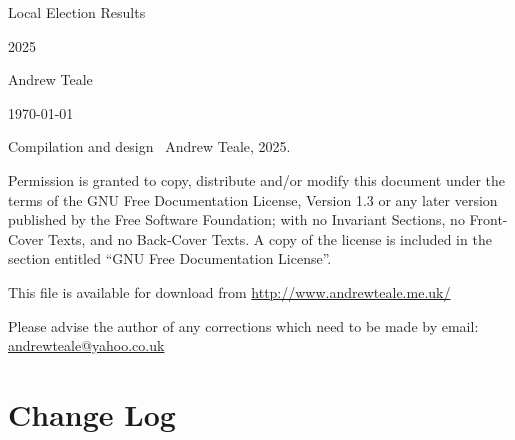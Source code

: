 \documentclass[a4paper,openany]{book}
\begin{document}

\begin{titlepage}

\begin{center}

\Huge Local Election Results

2025

\bigskip

\Large Andrew Teale

\vfill

\newcommand\versionno{0.10.1}


\today

\end{center}

\end{titlepage}


\begin{center}

%

\bigskip

Compilation and design \textcopyright\ Andrew Teale, 2025.

 Permission is granted to copy, distribute and/or modify this document
 under the terms of the GNU Free Documentation License, Version 1.3
 or any later version published by the Free Software Foundation;
 with no Invariant Sections, no Front-Cover Texts, and no Back-Cover Texts.
 A copy of the license is included in the section entitled ``GNU
 Free Documentation License''.

\bigskip

This file is available for download from
\url{http://www.andrewteale.me.uk/}

\bigskip

Please advise the author of any corrections which need to be made by
email: \url{andrewteale@yahoo.co.uk}

\vfill
\end{center}

\section*{Change Log}


%
\end{document}
